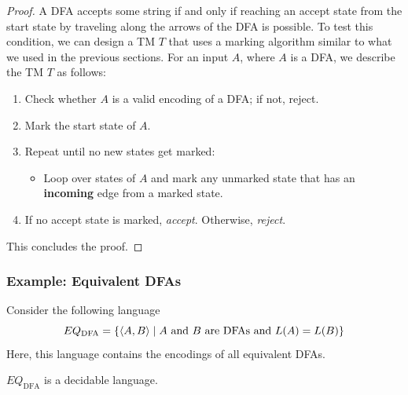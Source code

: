 \documentclass[letterpaper]{article}
\begin{document}
\begin{mdframed}[]
    \begin{proof}
        A DFA accepts some string if and only if reaching an accept state from the start state by traveling along the arrows of the DFA is possible. To test this condition, we can design a TM $T$ that uses a marking algorithm similar to what we used in the previous sections. For an input $A$, where $A$ is a DFA, we describe the TM $T$ as follows:
        \begin{enumerate}
            \item Check whether $A$ is a valid encoding of a DFA; if not, reject. 
            \item Mark the start state of $A$. 
            \item Repeat until no new states get marked: 
            \begin{itemize}
                \item Loop over states of $A$ and mark any unmarked state that has an \textbf{incoming} edge from a marked state. 
            \end{itemize}
            \item If no accept state is marked, \emph{accept}. Otherwise, \emph{reject}.
        \end{enumerate}
        This concludes the proof. 
    \end{proof}
\end{mdframed}

\subsubsection{Example: Equivalent DFAs}
Consider the following language
\[EQ_{\text{DFA}} = \{\langle A, B \rangle \mid A \text{ and } B \text{ are DFAs and } L(A) = L(B)\}\]
Here, this language contains the encodings of all equivalent DFAs. 

\begin{theorem}{}{}
    $EQ_{\text{DFA}}$ is a decidable language.
\end{theorem}
\end{document}
